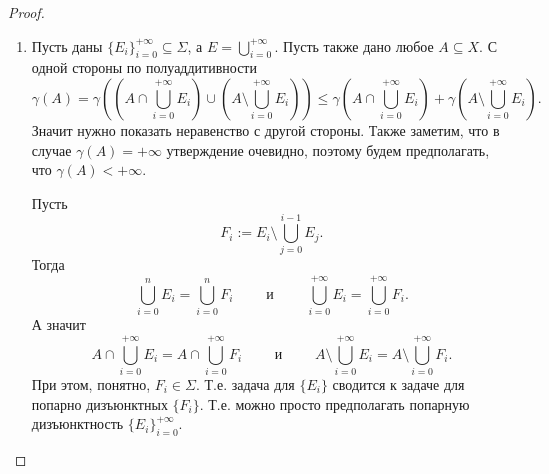 \documentclass[12pt,a4paper]{article}
\begin{document}
\begin{proof}
\begin{enumerate}
\begin{itemize}
                \end{itemize}
            \item Пусть даны $\{E_i\}_{i=0}^{+\infty} \subseteq \Sigma$, а $E = \bigcup_{i=0}^{+\infty}$. Пусть также дано любое $A \subseteq X$. С одной стороны по полуаддитивности
                \[
                    \gamma(A)
                    = \gamma\left(\left(A \cap \bigcup_{i=0}^{+\infty} E_i\right) \cup \left(A \setminus \bigcup_{i=0}^{+\infty} E_i\right)\right)
                    \leqslant \gamma\left(A \cap \bigcup_{i=0}^{+\infty} E_i\right) + \gamma\left(A \setminus \bigcup_{i=0}^{+\infty} E_i\right).
                \]
                Значит нужно показать неравенство с другой стороны. Также заметим, что в случае $\gamma(A) = +\infty$ утверждение очевидно, поэтому будем предполагать, что $\gamma(A) < +\infty$.
                
                Пусть
                \[F_i := E_i \setminus \bigcup_{j=0}^{i-1} E_j.\]
                Тогда
                \[
                    \bigcup_{i=0}^n E_i = \bigcup_{i=0}^n F_i
                    \qquad \text{ и } \qquad
                    \bigcup_{i=0}^{+\infty} E_i = \bigcup_{i=0}^{+\infty} F_i.
                \]
                А значит
                \[
                    A \cap \bigcup_{i=0}^{+\infty} E_i = A \cap \bigcup_{i=0}^{+\infty} F_i
                    \qquad \text{ и } \qquad
                    A \setminus \bigcup_{i=0}^{+\infty} E_i = A \setminus \bigcup_{i=0}^{+\infty} F_i.
                \]
                При этом, понятно, $F_i \in \Sigma$. Т.е. задача для $\{E_i\}$ сводится к задаче для попарно дизъюнктных $\{F_i\}$. Т.е. можно просто предполагать попарную дизъюнктность $\{E_i\}_{i=0}^{+\infty}$.


\end{enumerate}
\end{proof}
\end{document}
